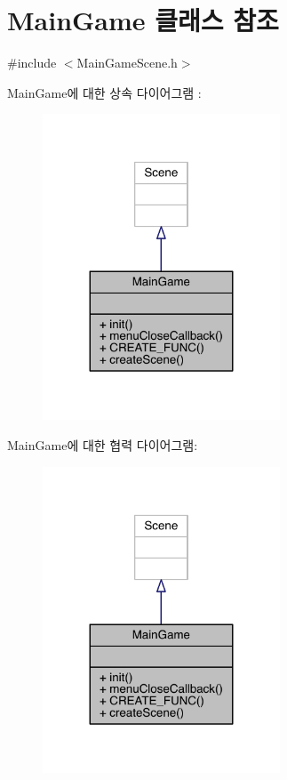 \hypertarget{class_main_game}{}\section{Main\+Game 클래스 참조}
\label{class_main_game}


{\ttfamily \#include $<$Main\+Game\+Scene.\+h$>$}



Main\+Game에 대한 상속 다이어그램 \+: 
\nopagebreak
\begin{figure}[H]
\begin{center}
\leavevmode
\includegraphics[width=200pt]{d0/d26/class_main_game__inherit__graph}
\end{center}
\end{figure}


Main\+Game에 대한 협력 다이어그램\+:
\nopagebreak
\begin{figure}[H]
\begin{center}
\leavevmode
\includegraphics[width=200pt]{d7/d0f/class_main_game__coll__graph}
\end{center}
\end{figure}

